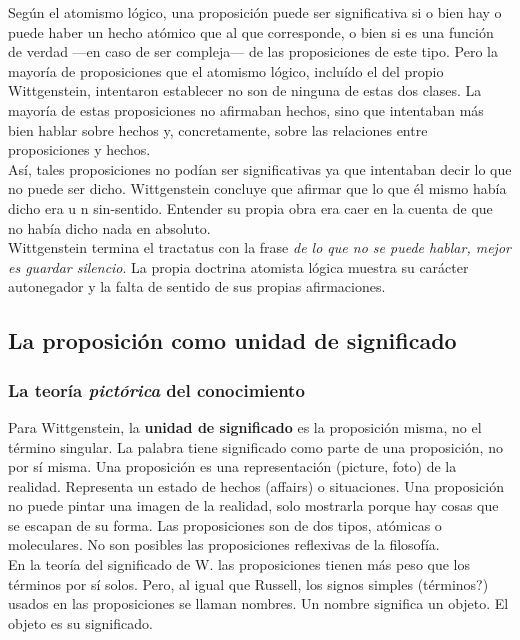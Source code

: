 \documentclass[a4paper, 11pt, twocolumn, spanish]{article}
\begin{document}
Según el atomismo lógico, una proposición puede ser significativa si o
bien hay o puede haber un hecho atómico que al que corresponde, o bien
si es una función de verdad —en caso de ser compleja— de las
proposiciones de este tipo. Pero la mayoría de proposiciones que el
atomismo lógico, incluído el del propio Wittgenstein, intentaron
establecer no son de ninguna de estas dos clases. La mayoría de estas
proposiciones no afirmaban hechos, sino que intentaban más bien hablar
sobre hechos y, concretamente, sobre las relaciones entre
proposiciones y hechos.\\

Así, tales proposiciones no podían ser significativas ya que
intentaban decir lo que no puede ser dicho. Wittgenstein concluye que
afirmar que lo que él mismo había dicho era u n sin-sentido. Entender
su propia obra era caer en la cuenta de que no había dicho nada en
absoluto.\\
Wittgenstein termina el tractatus con la frase \emph{de lo que no se puede
hablar, mejor es guardar silencio}. La propia doctrina atomista lógica
muestra su carácter autonegador y la falta de sentido de sus propias
afirmaciones.

\subsection{La proposición como unidad de significado}
\label{sec:org45e9d45}
\subsubsection{La teoría \emph{pictórica} del conocimiento}
\label{sec:org895cc6a}
Para Wittgenstein, la \textbf{unidad de significado} es la proposición misma,
no el término singular. La palabra tiene significado como parte de una
proposición, no por sí misma. Una proposición es una representación
(picture, foto) de la realidad. Representa un estado de hechos
(affairs) o situaciones. Una proposición no puede pintar una imagen de
la realidad, solo mostrarla porque hay cosas que se escapan de su
forma. Las proposiciones son de dos tipos, atómicas o moleculares. No
son posibles las proposiciones reflexivas de la filosofía.\\

En la teoría del significado de W. las proposiciones tienen más peso
que los términos por sí solos. Pero, al igual que Russell, los signos
simples (términos?) usados en las proposiciones se llaman nombres. Un
nombre significa un objeto. El objeto es su significado.\\
\end{document}

